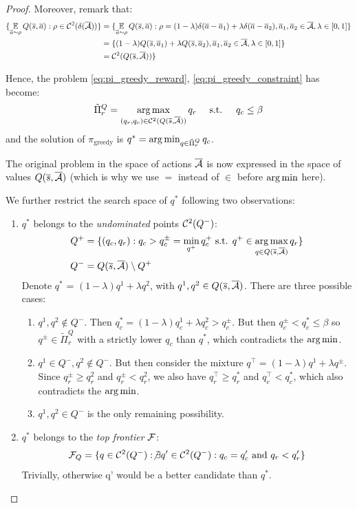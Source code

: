 \begin{subappendices}
\begin{proof}
	Moreover, remark that:
	\begin{align*}
	\{\operatorname*{\mathbb{E}}\limits_{\overline{a}\sim\rho} Q(\overline{s},\overline{a}): \rho\in \mathcal{C}^2(\delta(\overline{\mathcal{A}}))\} &= \{\operatorname*{\mathbb{E}}\limits_{\overline{a}\sim\rho} Q(\overline{s},\overline{a}): \rho=(1-\lambda)\delta(\overline{a}-\overline{a}_1)+\lambda\delta(\overline{a}-\overline{a}_2), \overline{a}_1,\overline{a}_2\in\overline{\mathcal{A}}, \lambda\in[0,1]\} \\
	&= \{(1-\lambda)Q(\overline{s}, \overline{a}_1)+\lambda Q(\overline{s}, \overline{a}_2), \overline{a}_1,\overline{a}_2\in\overline{\mathcal{A}}, \lambda\in[0,1]\} \\
	&= \mathcal{C}^2(Q(\overline{s},\overline{\mathcal{A}}))\}
	\end{align*}
	
	Hence, the problem \eqref{eq:pi_greedy_reward}, \eqref{eq:pi_greedy_constraint} has become:
	\begin{equation*}
	\tilde{\Pi}^Q_r = \operatorname*{arg\,max}_{(q_r, q_c)\in\mathcal{C}^2(Q(\overline{s}, \overline{\mathcal{A}}))} q_r \quad\text{ s.t. }\quad q_c \leq \beta 
	\end{equation*}
	and the solution of $\pi_\text{greedy}$ is $q^*=\operatorname*{arg\,min}_{q\in\tilde{\Pi}^Q_r} q_c$. 
	
	The original problem in the space of actions $\overline{\mathcal{A}}$ is now expressed in the space of values $Q(\overline{s}, \overline{\mathcal{A}})$ (which is why we use $=$ instead of $\in$ before $\operatorname*{arg\,min}$ here).
	
	We further restrict the search space of $q^*$ following two observations:
	\begin{enumerate}
		\item $q^*$ belongs to the \emph{undominated} points $\mathcal{C}^2(Q^-)$:
		\begin{align}
		\label{eq:q_minus_undominated}
		Q^+ &= \{(q_c, q_r): q_c > q_c^{\pm} = \min_{q^+} q_c^+\text{ s.t. }q^+\in\operatorname*{arg\,max}_{q\in Q(\overline{s},\overline{\mathcal{A}})} q_r\}\\
		Q^- &= Q(\overline{s},\overline{\mathcal{A}}) \setminus Q^+
		\end{align}
		Denote $q^*$ = $(1-\lambda) q^1 + \lambda q^2$, with $q^1, q^2\in Q(\overline{s},\overline{\mathcal{A}})$. There are three possible cases:
		\begin{enumerate}
			\item $q^1, q^2 \not\in Q^-$. Then $q_c^* = (1-\lambda) q^1_c + \lambda q^2_c > q_c^{\pm}$. But then $q_c^{\pm} < q_c^* \leq \beta$ so $q^{\pm}\in\tilde{\Pi}^Q_r$ with a strictly lower $q_c$ than $q^*$, which contradicts the $\operatorname*{arg\,min}$.
			\item $q^1\in Q^-, q^2 \not\in Q^-$. But then consider the mixture $q^\top = (1-\lambda) q^1 + \lambda q^\pm$. Since $q_r^{\pm} \geq q_r^{2}$ and $q_r^{\pm} < q_r^{2}$, we also have $q^\top_r \geq q_r^*$ and $q^\top_c < q_c^*$, which also contradicts the $\operatorname*{arg\,min}$.
			\item $q^1,q^2\in Q^-$ is the only remaining possibility.
		\end{enumerate}
		\item $q^*$ belongs to the \emph{top frontier} $\mathcal{F}$:
		\begin{equation}
		\label{eq:top-frontier}
		\mathcal{F}_Q = \{q\in \mathcal{C}^2(Q^-): \not\exists q'\in \mathcal{C}^2(Q^-): q_c=q_c'\text{ and }q_r<q_r'\}
		\end{equation}
		Trivially, otherwise q' would be a better candidate than $q^*$.
	\end{enumerate}
	

\end{proof}
\end{subappendices}
